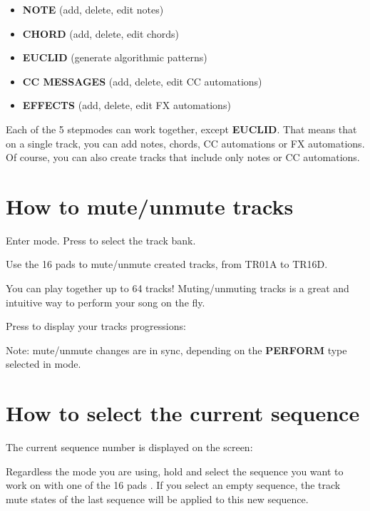 \begin{itemize}
\item \textbf{NOTE} (add, delete, edit notes)
\item \textbf{CHORD} (add, delete, edit chords)
\item \textbf{EUCLID} (generate algorithmic patterns)
\item \textbf{CC MESSAGES} (add, delete, edit CC automations)
\item \textbf{EFFECTS} (add, delete, edit FX automations)
\end{itemize}

Each of the 5 stepmodes can work together, except \textbf{EUCLID}. That means that on a single track, you can add notes, chords, CC automations or FX automations. Of course, you can also create tracks that include only notes or CC automations.


\section{How to mute/unmute tracks}

Enter  mode. Press \btn{<} \btn{>} to select the track bank.

Use the 16 pads \stepbystepicon{} to mute/unmute created tracks, from TR01A to TR16D.

You can play together up to 64 tracks! Muting/unmuting tracks is a great and intuitive way to perform your song on the fly.

Press  to display your tracks progressions:


Note: mute/unmute changes are in sync, depending on the \textbf{PERFORM} type selected in  mode.


\section{How to select the current sequence}

The current sequence number is displayed on the screen:


Regardless the mode you are using, hold  and select the sequence you want to work on with one of the 16 pads \stepbystepicon{}. If you select an empty sequence, the track mute states of the last sequence will be applied to this new sequence.


